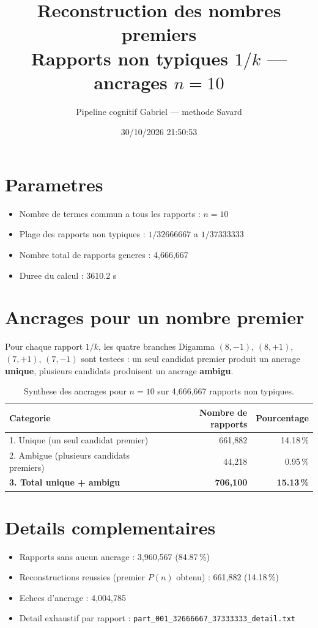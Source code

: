 \documentclass[12pt]{article}
\title{Reconstruction des nombres premiers\\Rapports non typiques $1/k$ --- ancrages $n=10$
}
\author{Pipeline cognitif Gabriel --- methode Savard}
\date{30/10/2026 21:50:53}
\begin{document}
\maketitle

\section*{Parametres}
\begin{itemize}
\item Nombre de termes commun a tous les rapports : $n=10$
\item Plage des rapports non typiques : $1/32666667$ a $1/37333333$
\item Nombre total de rapports generes : 4,666,667
\item Duree du calcul : 3610.2 s
\end{itemize}

\section*{Ancrages pour un nombre premier}

Pour chaque rapport $1/k$, les quatre branches Digamma $(8,-1)$, $(8,+1)$, $(7,+1)$, $(7,-1)$ sont testees : un seul candidat premier produit un ancrage \textbf{unique}, plusieurs candidats produisent un ancrage \textbf{ambigu}.

\begin{table}[h!]
\centering
\caption{Synthese des ancrages pour $n=10$ sur 4,666,667 rapports non typiques.}
\begin{tabular}{lrr}
\toprule
\textbf{Categorie} & \textbf{Nombre de rapports} & \textbf{Pourcentage} \\
\midrule
1. Unique (un seul candidat premier) & 661,882 & 14.18\,\% \\
2. Ambigue (plusieurs candidats premiers) & 44,218 & 0.95\,\% \\
\midrule
\textbf{3. Total unique + ambigu} & \textbf{706,100} & \textbf{15.13\,\%} \\
\bottomrule
\end{tabular}
\end{table}

\section*{Details complementaires}
\begin{itemize}
\item Rapports sans aucun ancrage : 3,960,567 (84.87\,\%)
\item Reconstructions reussies (premier $P(n)$ obtenu) : 661,882 (14.18\,\%)
\item Echecs d'ancrage : 4,004,785
\item Detail exhaustif par rapport : \texttt{part_001_32666667_37333333_detail.txt}
\end{itemize}
\end{document}
